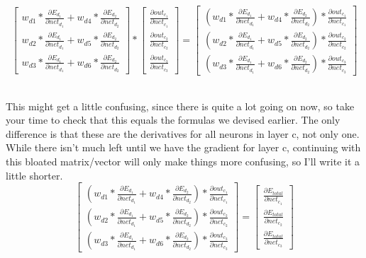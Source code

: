 \documentclass[11pt, halfparskip]{article}
\begin{document}
    \[
    	\begin{bmatrix}
    		w_{d1} * \frac{\partial E_{d_1}}{\partial net_{d_1}} + w_{d4} * \frac{\partial E_{d_2}}{\partial net_{d_2}}\\
    		w_{d2 }* \frac{\partial E_{d_1}}{\partial net_{d_1}} + w_{d5} * \frac{\partial E_{d_2}}{\partial net_{d_2}}\\
    		w_{d3} * \frac{\partial E_{d_1}}{\partial net_{d_1}} + w_{d6} * \frac{\partial E_{d_2}}{\partial net_{d_2}}
    	\end{bmatrix}
    	*
    	\begin{bmatrix}
    		\frac{\partial out_{c_1}}{\partial net_{c_1}}\\
    		\frac{\partial out_{c_2}}{\partial net_{c_2}}\\
    		\frac{\partial out_{c_3}}{\partial net_{c_3}}
    	\end{bmatrix}
    	=
    	\begin{bmatrix}
    		(w_{d1} * \frac{\partial E_{d_1}}{\partial net_{d_1}} + w_{d4} * \frac{\partial E_{d_2}}{\partial net_{d_2}}) * \frac{\partial out_{c_1}}{\partial net_{c_1}}\\
    		(w_{d2 }* \frac{\partial E_{d_1}}{\partial net_{d_1}} + w_{d5} * \frac{\partial E_{d_2}}{\partial net_{d_2}}) * \frac{\partial out_{c_2}}{\partial net_{c_2}}\\
    		(w_{d3} * \frac{\partial E_{d_1}}{\partial net_{d_1}} + w_{d6} * \frac{\partial E_{d_2}}{\partial net_{d_2}}) * \frac{\partial out_{c_3}}{\partial net_{c_3}}
    	\end{bmatrix}
    \]
    
    \noindent \\
    This might get a little confusing, since there is quite a lot going on now, so take your time to check that this equals the formulas we devised earlier. The only difference is that these
    are the derivatives for all neurons in layer c, not only one.\\
    While there isn't much left until we have the gradient for layer c, continuing with this bloated matrix/vector will only make things more confusing, so I'll write it a little shorter.
    \[
    	\begin{bmatrix}
    		(w_{d1} * \frac{\partial E_{d_1}}{\partial net_{d_1}} + w_{d4} * \frac{\partial E_{d_2}}{\partial net_{d_2}}) * \frac{\partial out_{c_1}}{\partial net_{c_1}}\\
    		(w_{d2 }* \frac{\partial E_{d_1}}{\partial net_{d_1}} + w_{d5} * \frac{\partial E_{d_2}}{\partial net_{d_2}}) * \frac{\partial out_{c_2}}{\partial net_{c_2}}\\
    		(w_{d3} * \frac{\partial E_{d_1}}{\partial net_{d_1}} + w_{d6} * \frac{\partial E_{d_2}}{\partial net_{d_2}}) * \frac{\partial out_{c_3}}{\partial net_{c_3}}
    	\end{bmatrix}
    	=
    	\begin{bmatrix}
    		\frac{\partial E_{total}}{\partial net_{c_1}}\\
    		\frac{\partial E_{total}}{\partial net_{c_2}}\\
    		\frac{\partial E_{total}}{\partial net_{c_3}}
    	 \end{bmatrix}
    \]
    
\end{document}
